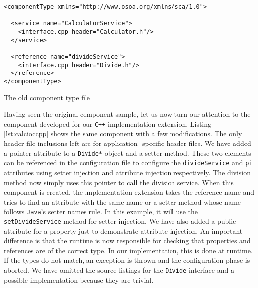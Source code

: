 \begin{listing}[!htbp]
\begin{verbatim}
<componentType xmlns="http://www.osoa.org/xmlns/sca/1.0">

  <service name="CalculatorService">
    <interface.cpp header="Calculator.h"/>
  </service>

  <reference name="divideService">
    <interface.cpp header="Divide.h"/>
  </reference>
</componentType>
\end{verbatim}
\caption{The old component type file}
\label{lst:calccppccomponenttype}
\end{listing}

Having seen the original component sample, let us now turn our attention to the component
developed for our \texttt{C++} implementation extension. Listing \ref{lst:calcioccpp} shows the same
component with a few modifications. The only header file inclusions left are for application-
specific header files. We have added a pointer attribute to a \texttt{Divide*} object and a
setter method. These two elements can be referenced in the configuration file to configure
the \texttt{divideService} and \texttt{pi} attributes using setter injection and attribute injection respectively.
The division method now simply uses this pointer to call the division service.
When this component is created, the implementation extension takes the reference name and
tries to find an attribute with the same name or a setter method whose name follows \texttt{Java}'s
setter names rule. In this example, it will use the \texttt{setDivideService} method for
setter injection. We have also added a public attribute for a property just to demonstrate
attribute injection. An important difference is that the runtime is now responsible for
checking that properties and references are of the correct type. In our implementation, this
is done at runtime. If the types do not match, an exception is thrown and the configuration
phase is aborted. We have omitted the source listings for the \texttt{Divide} interface and
a possible implementation because they are trivial.

